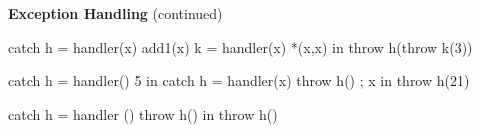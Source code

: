 \begin{minipage}[t]{\sw}
\slidenumber
\LARGE
{\bf Exception Handling} (continued)
\Large
\begin{qv}
catch
    h = handler(x) add1(x) 
    k = handler(x) *(x,x)
in
    throw h(throw k(3)) %

catch
    h = handler() 5
in
    catch
        h = handler(x) {throw h() ; x}
    in
        throw h(21) %

catch
    h = handler () throw h()
in
    throw h() %
\end{qv}

\end{minipage}
